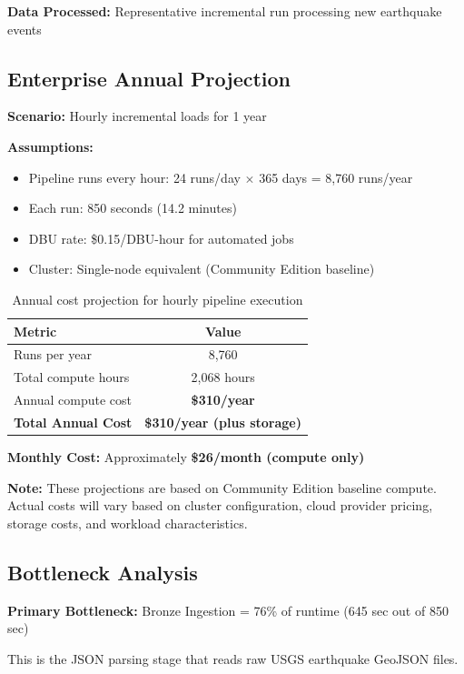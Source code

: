\documentclass[11pt,a4paper]{article}
\begin{document}
\textbf{Data Processed:} Representative incremental run processing new earthquake events

\subsection{Enterprise Annual Projection}

\textbf{Scenario:} Hourly incremental loads for 1 year

\textbf{Assumptions:}
\begin{itemize}
    \item Pipeline runs every hour: 24 runs/day $\times$ 365 days = 8,760 runs/year
    \item Each run: 850 seconds (14.2 minutes)
    \item DBU rate: \$0.15/DBU-hour for automated jobs
    \item Cluster: Single-node equivalent (Community Edition baseline)
\end{itemize}

\begin{table}[h]
\centering
\begin{tabular}{@{}lc@{}}
\toprule
\textbf{Metric} & \textbf{Value} \\
\midrule
Runs per year & 8,760 \\
Total compute hours & 2,068 hours \\
Annual compute cost & \textbf{\$310/year} \\
\midrule
\textbf{Total Annual Cost} & \textbf{\$310/year (plus storage)} \\
\bottomrule
\end{tabular}
\caption{Annual cost projection for hourly pipeline execution}
\end{table}

\textbf{Monthly Cost:} Approximately \textbf{\$26/month (compute only)}

\textbf{Note:} These projections are based on Community Edition baseline compute. Actual costs will vary based on cluster configuration, cloud provider pricing, storage costs, and workload characteristics.

\subsection{Bottleneck Analysis}

\textbf{Primary Bottleneck:} Bronze Ingestion = 76\% of runtime (645 sec out of 850 sec)

This is the JSON parsing stage that reads raw USGS earthquake GeoJSON files.
\end{document}
